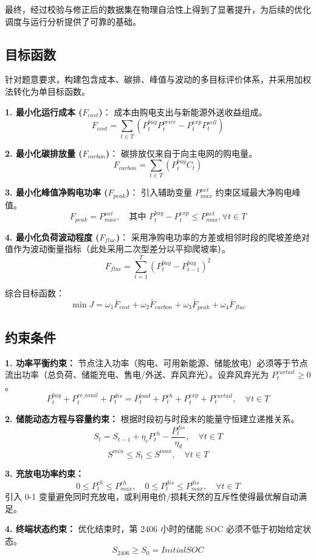 \documentclass[UTF8,a4paper,zihao=-4]{ctexart}
\begin{document}
最终，经过校验与修正后的数据集在物理自洽性上得到了显著提升，为后续的优化调度与运行分析提供了可靠的基础。
\subsection{目标函数}
针对题意要求，构建包含成本、碳排、峰值与波动的多目标评价体系，并采用加权法转化为单目标函数。

\textbf{1. 最小化运行成本 ($F_{cost}$)}：
成本由购电支出与新能源外送收益组成。
$$
F_{cost} = \sum_{t \in T} \left( P_{t}^{buy} P_{t}^{price} - P_{t}^{exp} P_{t}^{sell} \right)
$$

\textbf{2. 最小化碳排放量 ($F_{carbon}$)}：
碳排放仅来自于向主电网的购电量。
$$
F_{carbon} = \sum_{t \in T} \left( P_{t}^{buy} C_t \right)
$$

\textbf{3. 最小化峰值净购电功率 ($F_{peak}$)}：
引入辅助变量 $P_{max}^{net}$ 约束区域最大净购电峰值。
$$
F_{peak} = P_{max}^{net}, \quad \text{其中 } P_{t}^{buy} - P_{t}^{exp} \le P_{max}^{net}, \forall t \in T
$$

\textbf{4. 最小化负荷波动程度 ($F_{fluc}$)}：
采用净购电功率的方差或相邻时段的爬坡差绝对值作为波动衡量指标（此处采用二次型差分以平抑爬坡率）。
$$
F_{fluc} = \sum_{t=1}^{T} (P_{t}^{buy} - P_{t-1}^{buy})^2
$$

综合目标函数：
$$
\min J = \omega_1 \bar{F}_{cost} + \omega_2 \bar{F}_{carbon} + \omega_3 \bar{F}_{peak} + \omega_4 \bar{F}_{fluc}
$$

\subsection{约束条件}
\textbf{1. 功率平衡约束：}
节点注入功率（购电、可用新能源、储能放电）必须等于节点流出功率（总负荷、储能充电、售电/外送、弃风弃光）。设弃风弃光为 $P_t^{curtail} \ge 0$。
$$
P_{t}^{buy} + P_{t}^{re\_avail} + P_{t}^{dis} = P_{t}^{load} + P_{t}^{ch} + P_{t}^{exp} + P_{t}^{curtail}, \quad \forall t \in T
$$

\textbf{2. 储能动态方程与容量约束：}
根据时段初与时段末的能量守恒建立递推关系。
$$
S_t = S_{t-1} + \eta_c P_{t}^{ch} - \frac{P_{t}^{dis}}{\eta_d}, \quad \forall t \in T
$$
$$
S^{min} \le S_t \le S^{max}, \quad \forall t \in T
$$

\textbf{3. 充放电功率约束：}
$$
0 \le P_{t}^{ch} \le P_{max}^{ch}, \quad 0 \le P_{t}^{dis} \le P_{max}^{dis}, \quad \forall t \in T
$$
引入 0-1 变量避免同时充放电，或利用电价/损耗天然的互斥性使得最优解自动满足。

\textbf{4. 终端状态约束：}
优化结束时，第 2406 小时的储能 SOC 必须不低于初始给定状态。
$$
S_{2406} \ge S_0 = InitialSOC
$$
\end{document}
